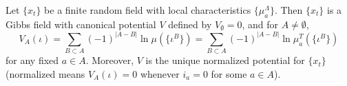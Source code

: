 Let $\{x_t\}$ be a finite random field with local characteristics $\{\mu_a^\Lambda\}$. Then $\{x_t\}$ is a Gibbs field with canonical potential $V$ defined by $V_\emptyset = 0$, and for $A \neq \emptyset$,
$$V_A(\iota) = \sum_{B \subset A} (-1)^{|A-B|} \ln \mu(\{\iota^B\}) = \sum_{B \subset A} (-1)^{|A-B|} \ln \mu_a^T(\{\iota^B\})$$
for any fixed $a \in A$. Moreover, $V$ is the unique normalized potential for $\{x_t\}$ (normalized means $V_A(\iota) = 0$ whenever $i_a = 0$ for some $a \in A$).
